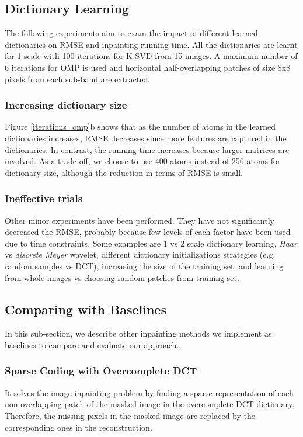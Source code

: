 \documentclass[conference]{IEEEtran}
\begin{document}
\subsection{Dictionary Learning}
The following experiments aim to exam the impact of different learned dictionaries on RMSE and inpainting running time. All the dictionaries are learnt for 1 scale with 100 iterations \cite{imageInpaintingAlgo} for K-SVD from 15 images. A maximum number of 6 iterations for OMP is used and horizontal half-overlapping patches of size 8x8 pixels from each sub-band are extracted.

\subsubsection{Increasing dictionary size}
Figure \ref{iterations_omp}b shows that as the number of atoms in the learned dictionaries increases, RMSE decreases since more features are captured in the dictionaries. In contrast, the running time increases because larger matrices are involved. As a trade-off, we choose to use 400 atoms instead of 256 atoms for dictionary size, although the reduction in terms of RMSE is small.

\subsubsection{Ineffective trials}
Other minor experiments have been performed. They have not significantly decreased the RMSE, probably because few levels of each factor have been used due to time constraints. Some examples are 1 vs 2 scale dictionary learning, \textit{Haar} vs \textit{discrete Meyer} wavelet, different dictionary initializations strategies (e.g. random samples vs DCT), increasing the size of the training set, and learning from whole images vs choosing random patches from training set.
\subsection{Comparing with Baselines} \label{baselinesSection}
In this sub-section, we describe other inpainting methods we implement as baselines to compare and evaluate our approach.
\subsubsection{Sparse Coding with Overcomplete DCT} \label{dct}
It solves the image inpainting problem by finding a sparse representation of each non-overlapping patch of the masked image in the overcomplete DCT dictionary. Therefore, the missing pixels in the masked image are replaced by the corresponding ones in the reconstruction.
\end{document}
